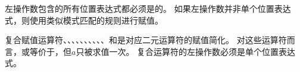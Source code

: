 左操作数包含的所有位置表达式都必须是的。
如果左操作数并非单个位置表达式，则使用类似模式匹配的规则进行赋值。

\pnum
复合赋值运算符\tcode{+=}、\tcode{-=}、\tcode{*=}、\tcode{/=}、\tcode{\%=}、、、、、、\tcode{\~=}和是对应二元运算符的赋值简化。
对这些运算符而言，或等价于，但$a$只被求值一次。
复合运算符的左操作数必须是单个位置表达式。